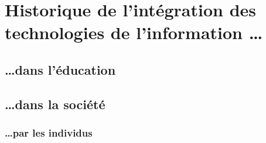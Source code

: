 
\chapter{Historique de l'intégration des technologies de l'information \ldots}\label{quoi}

\section{\ldots dans l'éducation}

\section{\ldots dans la société}

\subsection{\ldots par les individus}


